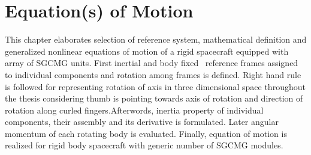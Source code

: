 \chapter{Equation(s) of Motion}
\label{chap:2}
This chapter elaborates selection of reference system, mathematical definition and generalized nonlinear equations of motion of a rigid spacecraft equipped with array of SGCMG units. First inertial and body fixed \ reference frames assigned to individual components and rotation among frames is defined. Right hand rule is followed for representing  rotation of axis in three dimensional space throughout the thesis considering thumb is pointing towards axis of rotation and direction of rotation along curled fingers.Afterwords, inertia property of individual components, their assembly and its derivative is formulated. Later angular momentum of each rotating body is evaluated. Finally, equation of motion is realized for rigid body spacecraft with generic number of SGCMG modules. 


\clearpage

